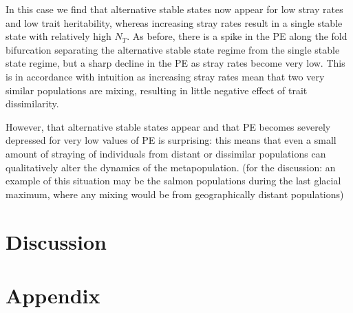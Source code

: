 \documentclass[twocolumn,preprintnumbers,amsmath,amssymb,superscriptaddress]{revtex4}
\begin{document}
In this case we find that alternative stable states now appear for low stray rates and low trait heritability, whereas increasing stray rates result in a single stable state with relatively high $N_T$.
As before, there is a spike in the PE along the fold bifurcation separating the alternative stable state regime from the single stable state regime, but a sharp decline in the PE as stray rates become very low.
This is in accordance with intuition as increasing stray rates mean that two very similar populations are mixing, resulting in little negative effect of trait dissimilarity.

However, that alternative stable states appear and that PE becomes severely depressed for very low values of PE is surprising: this means that even a small amount of straying of individuals from distant or dissimilar populations can qualitatively alter the dynamics of the metapopulation.
(for the discussion: an example of this situation may be the salmon populations during the last glacial maximum, where any mixing would be from geographically distant populations)









\section*{Discussion}

\clearpage
\setcounter{figure}{0}
\section*{Appendix}
\end{document}
